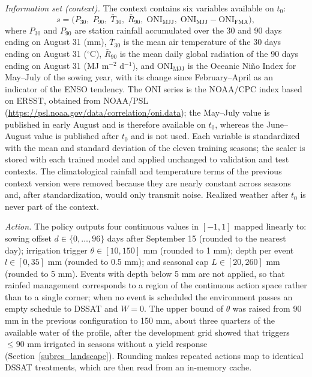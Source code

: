 \documentclass[times,final,authoryear]{elsarticle}
\begin{document}
\emph{Information set (context).} The context contains six variables available on $t_0$:
\begin{equation}
s = \big(P_{30},\; P_{90},\; \bar{T}_{30},\; \bar{R}_{90},\; \mathrm{ONI}_{\mathrm{MJJ}},\; \mathrm{ONI}_{\mathrm{MJJ}}-\mathrm{ONI}_{\mathrm{FMA}}\big),
\label{eq_context}
\end{equation}
where $P_{30}$ and $P_{90}$ are station rainfall accumulated over the 30 and 90 days ending on August 31 (mm), $\bar{T}_{30}$ is the mean air temperature of the 30 days ending on August 31 ($^{\circ}$C), $\bar{R}_{90}$ is the mean daily global radiation of the 90 days ending on August 31 (MJ m$^{-2}$ d$^{-1}$), and $\mathrm{ONI}_{\mathrm{MJJ}}$ is the Oceanic Ni\~no Index for May--July of the sowing year, with its change since February--April as an indicator of the ENSO tendency. The ONI series is the NOAA/CPC index based on ERSST, obtained from NOAA/PSL (\url{https://psl.noaa.gov/data/correlation/oni.data}); the May--July value is published in early August and is therefore available on $t_0$, whereas the June--August value is published after $t_0$ and is not used. Each variable is standardized with the mean and standard deviation of the eleven training seasons; the scaler is stored with each trained model and applied unchanged to validation and test contexts. The climatological rainfall and temperature terms of the previous context version were removed because they are nearly constant across seasons and, after standardization, would only transmit noise. Realized weather after $t_0$ is never part of the context.

\emph{Action.} The policy outputs four continuous values in $[-1,1]$ mapped linearly to: sowing offset $d \in \{0,\dots,96\}$ days after September 15 (rounded to the nearest day); irrigation trigger $\theta \in [10, 150]$ mm (rounded to 1 mm); depth per event $l \in [0, 35]$ mm (rounded to 0.5 mm); and seasonal cap $L \in [20, 260]$ mm (rounded to 5 mm). Events with depth below 5 mm are not applied, so that rainfed management corresponds to a region of the continuous action space rather than to a single corner; when no event is scheduled the environment passes an empty schedule to DSSAT and $W = 0$. The upper bound of $\theta$ was raised from 90 mm in the previous configuration to 150 mm, about three quarters of the available water of the profile, after the development grid showed that triggers $\leq 90$ mm irrigated in seasons without a yield response (Section~\ref{subres_landscape}). Rounding makes repeated actions map to identical DSSAT treatments, which are then read from an in-memory cache.
\end{document}
